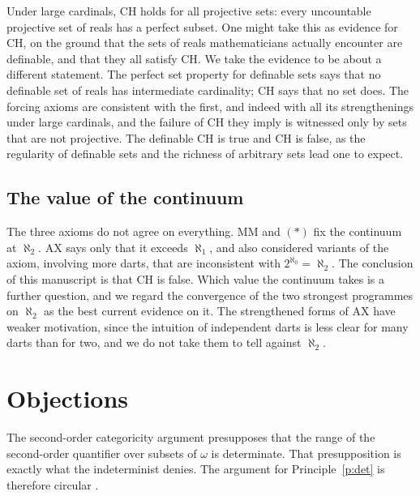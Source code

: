 \documentclass{situationist-preprint}
\begin{document}
Under large cardinals, CH holds for all projective sets: every uncountable projective set of reals has a perfect subset. One might take this as evidence for CH, on the ground that the sets of reals mathematicians actually encounter are definable, and that they all satisfy CH. We take the evidence to be about a different statement. The perfect set property for definable sets says that no definable set of reals has intermediate cardinality; CH says that no set does. The forcing axioms are consistent with the first, and indeed with all its strengthenings under large cardinals, and the failure of CH they imply is witnessed only by sets that are not projective. The definable CH is true and CH is false, as the regularity of definable sets and the richness of arbitrary sets lead one to expect.

\subsection{The value of the continuum}

The three axioms do not agree on everything. MM and $(*)$ fix the continuum at $\aleph_2$. AX says only that it exceeds $\aleph_1$, and \citet{Freiling1986} also considered variants of the axiom, involving more darts, that are inconsistent with $2^{\aleph_0} = \aleph_2$. The conclusion of this manuscript is that CH is false. Which value the continuum takes is a further question, and we regard the convergence of the two strongest programmes on $\aleph_2$ as the best current evidence on it. The strengthened forms of AX have weaker motivation, since the intuition of independent darts is less clear for many darts than for two, and we do not take them to tell against $\aleph_2$.

\section{Objections}\label{s:objections}

\begin{objection}[Indeterminacy]\label{o:indet}
The second-order categoricity argument presupposes that the range of the second-order quantifier over subsets of $\omega$ is determinate. That presupposition is exactly what the indeterminist denies. The argument for Principle~\ref{p:det} is therefore circular \citep{Feferman1999,Hamkins2012}.
\end{objection}
\end{document}
